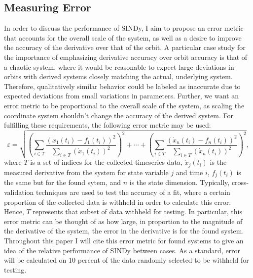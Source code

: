 \documentclass[10pt]{paper}
\begin{document}
\subsection{Measuring Error} \label{sec:measuring_error}
In order to discuss the performance of SINDy, I aim to propose an error metric that accounts for the overall scale of the system, as well as a desire to improve the accuracy of the derivative over that of the orbit. A particular case study for the importance of emphasizing derivative accuracy over orbit accuracy is that of a chaotic system, where it would be reasonable to expect large deviations in orbits with derived systems closely matching the actual, underlying system. 
Therefore, qualitatively similar behavior could be labeled as inaccurate due to expected deviations from small variations in parameters. Further, we want an error metric to be proportional to the overall scale of the system, as scaling the coordinate system shouldn't change the accuracy of the derived system. 
For fulfilling these requirements, the following error metric may be used: 
\[ \varepsilon = \sqrt{ \left( \sum_{i \in T} \frac{(\dot x_1(t_i) - f_1(t_i))^2}{\sum_{i \in T} (\dot x_1(t_i))^2} \right)^2 + \cdots + \left( \sum_{i \in T} \frac{(\dot x_n(t_i) - f_n(t_i))^2}{\sum_{i \in T} (\dot x_n(t_i))^2} \right)^2 }, \]
where $T$ is a set of indices for the collected timeseries data, $\dot x_j(t_i)$ is the measured derivative from the system for state variable $j$ and time $i$, $f_j(t_i)$ is the same but for the found sytem, and $n$ is the state dimension. 
Typically, cross-validation techniques are used to test the accuracy of a fit, where a certain proportion of the collected data is withheld in order to calculate this error. Hence, $T$ represents that subset of data withheld for testing. 
In particular, this error metric can be thought of as how large, in proportion to the magnitude of the derivative of the system, the error in the derivative is for the found system. Throughout this paper I will cite this error metric for found systems to give an idea of the relative performance of SINDy between cases. 
As a standard, error will be calculated on 10 percent of the data randomly selected to be withheld for testing. 
\end{document}
